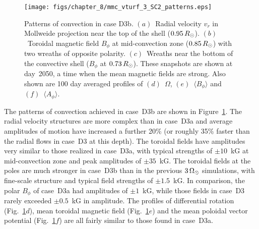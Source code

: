 \begin{figure}
  \begin{center}
    \texttt{[image: figs/chapter\_8/mmc\_vturf\_3\_SC2\_patterns.eps]}
  \end{center}
  \caption[Patterns of convection in case D3b]{Patterns of convection
  in case D3b.  $(a)$~Radial velocity $v_r$ in Mollweide projection
  near the top of the shell ($0.95\thinspace R_\odot$).  
  $(b)$~Toroidal magnetic field $B_\phi$ at mid-convection zone
  ($0.85\thinspace R_\odot$) with two wreaths of opposite polarity.  
  $(c)$~Wreaths near the bottom of the
  convective shell ($B_\phi$ at $0.73\thinspace R_\odot$).
  These snapshots are shown at day~2050, a time when the mean
  magnetic fields are strong.
  Also shown are 100 day averaged profiles of $(d)$~$\Omega$, 
  $(e)$~$\langle B_\phi \rangle$ and
  $(f)$~$\langle A_\phi \rangle$.
  \label{fig:D3b convection}} 
\end{figure}

The patterns of convection achieved in case~D3b are shown in
Figure~\ref{fig:D3b convection}.  The radial velocity structures are
more complex than in case~D3a and average amplitudes of
motion have increased a further 20\% (or roughly 35\% faster than the
radial flows in case~D3 at this depth).  The toroidal fields have 
amplitudes very similar to those realized in case~D3a, with typical
strengths of $\pm10$~kG at mid-convection zone and peak amplitudes of $\pm35$~kG.
The toroidal fields at the poles are much stronger in case~D3b than in
the previous $3\thinspace\Omega_\odot$ simulations, 
with fine-scale structure and typical field strengths of $\pm1.5$~kG.
In comparison, the polar $B_\phi$ of case~D3a had amplitudes of
$\pm1$~kG, while those fields in case~D3 rarely exceeded $\pm0.5$~kG
in amplitude.  The profiles of differential rotation
(Fig.~\ref{fig:D3b convection}$d$), mean toroidal magnetic field
(Fig.~\ref{fig:D3b convection}$e$) and the mean poloidal vector
potential (Fig.~\ref{fig:D3b convection}$f$) are all fairly similar to
those found in case~D3a.



